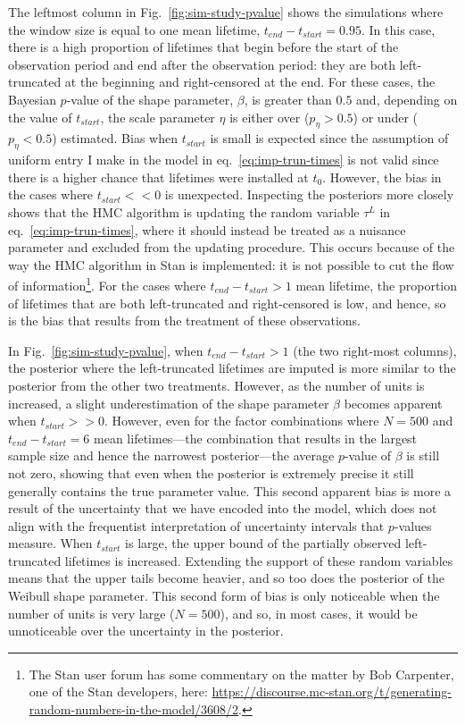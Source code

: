 The leftmost column in Fig.~\ref{fig:sim-study-pvalue} shows the simulations where the window size is equal to one mean lifetime, $t_{end} - t_{start} = 0.95$. In this case, there is a high proportion of lifetimes that begin before the start of the observation period and end after the observation period: they are both left-truncated at the beginning and right-censored at the end. For these cases, the Bayesian $p$-value of the shape parameter, $\beta$, is greater than $0.5$ and, depending on the value of $t_{start}$, the scale parameter $\eta$ is either over ($p_{\eta} > 0.5$) or under ($p_{\eta} < 0.5$) estimated. Bias when $t_{start}$ is small is expected since the assumption of uniform entry I make in the model in eq.~\eqref{eq:imp-trun-times} is not valid since there is a higher chance that lifetimes were installed at $t_0$. However, the bias in the cases where $t_{start} << 0$ is unexpected. Inspecting the posteriors more closely shows that the HMC algorithm is updating the random variable $\tau^L$ in eq.~\eqref{eq:imp-trun-times}, where it should instead be treated as a nuisance parameter and excluded from the updating procedure. This occurs because of the way the HMC algorithm in Stan is implemented: it is not possible to cut the flow of information\footnote{The Stan user forum has some commentary on the matter by Bob Carpenter, one of the Stan developers, here: \href{https://discourse.mc-stan.org/t/generating-random-numbers-in-the-model/3608/2}{https://discourse.mc-stan.org/t/generating-random-numbers-in-the-model/3608/2}.}. For the cases where $t_{end} - t_{start} > 1$ mean lifetime, the proportion of lifetimes that are both left-truncated and right-censored is low, and hence, so is the bias that results from the treatment of these observations. 

In Fig.~\ref{fig:sim-study-pvalue}, when $t_{end} - t_{start} > 1$ (the two right-most columns), the posterior where the left-truncated lifetimes are imputed is more similar to the posterior from the other two treatments. However, as the number of units is increased, a slight underestimation of the shape parameter $\beta$ becomes apparent when $t_{start} >> 0$. However, even for the factor combinations where $N = 500$ and $t_{end} - t_{start} = 6$ mean lifetimes---the combination that results in the largest sample size and hence the narrowest posterior---the average $p$-value of $\beta$ is still not zero, showing that even when the posterior is extremely precise it still generally contains the true parameter value. This second apparent bias is more a result of the uncertainty that we have encoded into the model, which does not align with the frequentist interpretation of uncertainty intervals that $p$-values measure. When $t_{start}$ is large, the upper bound of the partially observed left-truncated lifetimes is increased. Extending the support of these random variables means that the upper tails become heavier, and so too does the posterior of the Weibull shape parameter. This second form of bias is only noticeable when the number of units is very large ($N = 500$), and so, in most cases, it would be unnoticeable over the uncertainty in the posterior.

